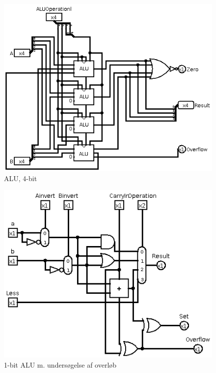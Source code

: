 \documentclass[10pt,a4paper,danish]{article}
\begin{document}
\begin{figure}[htb]
\begin{center}
\leavevmode
\includegraphics[scale=0.70]{circ2.png}
\end{center}
\caption{ALU, 4-bit}
\label{fig:circ2}
\end{figure}

\begin{figure}[htb]
\begin{center}
\leavevmode
\includegraphics[scale=0.70]{alu-1bit-overflow.png}
\end{center}
\caption{1-bit ALU m. undersøgelse af overløb}
\label{fig:alu-1bit}
\end{figure}
\end{document}
